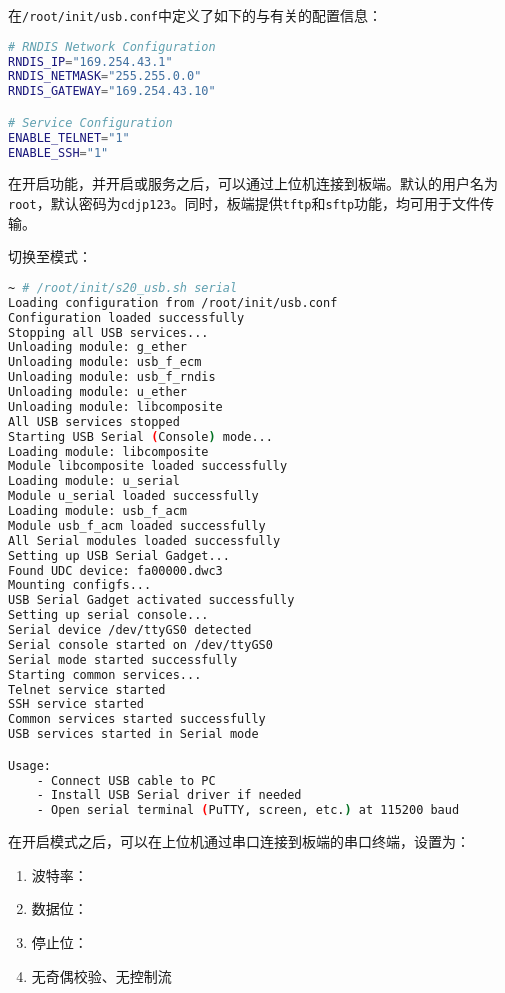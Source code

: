 \documentclass[UTF8]{ctexart}
\newcommand{\code}[1]{\colorbox{gray!10}{\lstinline[style=inlinecode]|#1|}}
\begin{document}
\noindent 在\code{/root/init/usb.conf}中定义了如下的与有关的配置信息：

\begin{lstlisting}[language=sh]
# RNDIS Network Configuration
RNDIS_IP="169.254.43.1"
RNDIS_NETMASK="255.255.0.0"
RNDIS_GATEWAY="169.254.43.10"

# Service Configuration
ENABLE_TELNET="1"
ENABLE_SSH="1"
\end{lstlisting}

\noindent 在开启功能，并开启或服务之后，可以通过上位机连接到板端。默认的用户名为\code{root}，默认密码为\code{cdjp123}。同时，板端提供\code{tftp}和\code{sftp}功能，均可用于文件传输。

切换至模式：

\begin{lstlisting}[language=sh]
~ # /root/init/s20_usb.sh serial
Loading configuration from /root/init/usb.conf
Configuration loaded successfully
Stopping all USB services...
Unloading module: g_ether
Unloading module: usb_f_ecm
Unloading module: usb_f_rndis
Unloading module: u_ether
Unloading module: libcomposite
All USB services stopped
Starting USB Serial (Console) mode...
Loading module: libcomposite
Module libcomposite loaded successfully
Loading module: u_serial
Module u_serial loaded successfully
Loading module: usb_f_acm
Module usb_f_acm loaded successfully
All Serial modules loaded successfully
Setting up USB Serial Gadget...
Found UDC device: fa00000.dwc3
Mounting configfs...
USB Serial Gadget activated successfully
Setting up serial console...
Serial device /dev/ttyGS0 detected
Serial console started on /dev/ttyGS0
Serial mode started successfully
Starting common services...
Telnet service started
SSH service started
Common services started successfully
USB services started in Serial mode

Usage:
    - Connect USB cable to PC
    - Install USB Serial driver if needed
    - Open serial terminal (PuTTY, screen, etc.) at 115200 baud
\end{lstlisting}

\noindent 在开启模式之后，可以在上位机通过串口连接到板端的串口终端，设置为：

\begin{enumerate}
    \item 波特率：
    \item 数据位：
    \item 停止位：
    \item 无奇偶校验、无控制流
\end{enumerate}
\end{document}
